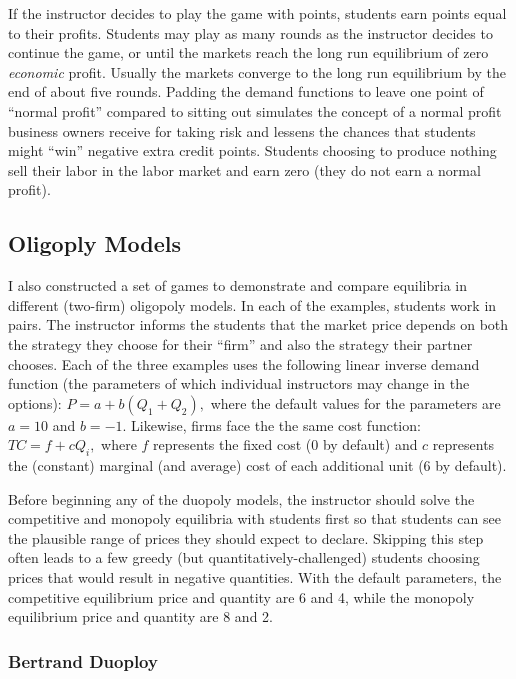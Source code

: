 \documentclass[
]{article}
\begin{document}
If the instructor decides to play the game with points, students earn
points equal to their profits. Students may play as many rounds as the
instructor decides to continue the game, or until the markets reach the
long run equilibrium of zero \emph{economic} profit. Usually the markets
converge to the long run equilibrium by the end of about five rounds.
Padding the demand functions to leave one point of ``normal profit''
compared to sitting out simulates the concept of a normal profit
business owners receive for taking risk and lessens the chances that
students might ``win'' negative extra credit points. Students choosing
to produce nothing sell their labor in the labor market and earn zero
(they do not earn a normal profit).

\hypertarget{oligoply-models}{%
\subsection{Oligoply Models}\label{oligoply-models}}

I also constructed a set of games to demonstrate and compare equilibria
in different (two-firm) oligopoly models. In each of the examples,
students work in pairs. The instructor informs the students that the
market price depends on both the strategy they choose for their ``firm''
and also the strategy their partner chooses. Each of the three examples
uses the following linear inverse demand function (the parameters of
which individual instructors may change in the options):
\(P = a + b(Q_1 + Q_2),\) where the default values for the parameters
are \(a = 10\) and \(b = -1\). Likewise, firms face the the same cost
function: \(TC = f + cQ_i,\) where \(f\) represents the fixed cost (0 by
default) and \(c\) represents the (constant) marginal (and average) cost
of each additional unit (6 by default).

Before beginning any of the duopoly models, the instructor should solve
the competitive and monopoly equilibria with students first so that
students can see the plausible range of prices they should expect to
declare. Skipping this step often leads to a few greedy (but
quantitatively-challenged) students choosing prices that would result in
negative quantities. With the default parameters, the competitive
equilibrium price and quantity are 6 and 4, while the monopoly
equilibrium price and quantity are 8 and 2.

\hypertarget{bertrand-duoploy}{%
\subsubsection{Bertrand Duoploy}\label{bertrand-duoploy}}
\end{document}
